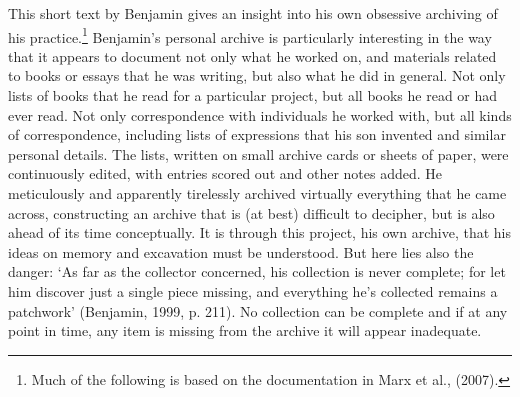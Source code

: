 This short text by Benjamin gives an insight into his own obsessive
archiving of his practice.\footnote{Much of the following is based on
  the documentation in Marx et al., (2007).} Benjamin's personal archive
is particularly interesting in the way that it appears to document not
only what he worked on, and materials related to books or essays that he
was writing, but also what he did in general. Not only lists of books
that he read for a particular project, but all books he read or had ever
read. Not only correspondence with individuals he worked with, but all
kinds of correspondence, including lists of expressions that his son
invented and similar personal details. The lists, written on small
archive cards or sheets of paper, were continuously edited, with entries
scored out and other notes added. He meticulously and apparently
tirelessly archived virtually everything that he came across,
constructing an archive that is (at best) difficult to decipher, but is
also ahead of its time conceptually. It is through this project, his own
archive, that his ideas on memory and excavation must be understood. But
here lies also the danger: `As far as the collector concerned, his
collection is never complete; for let him discover just a single piece
missing, and everything he's collected remains a patchwork' (Benjamin,
1999, p. 211). No collection can be complete and if at any point in
time, any item is missing from the archive it will appear inadequate.

